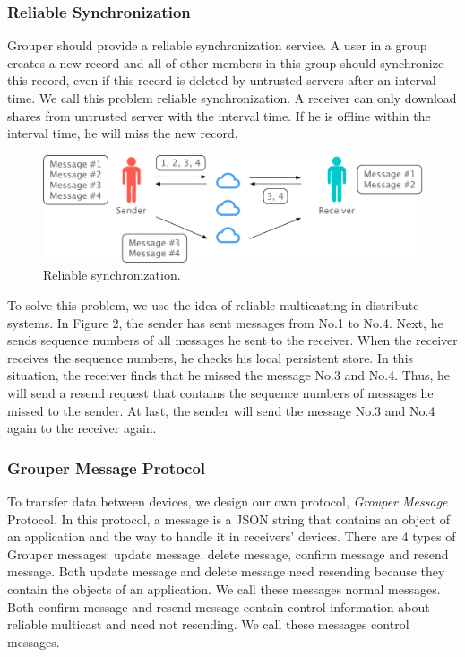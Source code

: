 \documentclass[twocolumn,10pt]{article}
\begin{document}
\subsubsection{Reliable Synchronization}

Grouper should provide a reliable synchronization service. 
A user in a group creates a new record and all of other members in this group should synchronize this record, even if this record is deleted by untrusted servers after an interval time. 
We call this problem reliable synchronization. 
A receiver can only download shares from untrusted server with the interval time. 
If he is offline within the interval time, he will miss the new record.

\begin{figure}[t]
	\centering
	\includegraphics[scale=0.32]{reliable_sync}
	\caption{Reliable synchronization.}
\end{figure}

To solve this problem, we use the idea of reliable multicasting in distribute systems. 
In Figure 2, the sender has sent messages from No.1 to No.4. 
Next, he sends sequence numbers of all messages he sent to the receiver. 
When the receiver receives the sequence numbers, he checks his local persistent store. 
In this situation, the receiver finds that he missed the message No.3 and No.4. 
Thus, he will send a resend request that contains the sequence numbers of messages he missed to the sender. 
At last, the sender will send the message No.3 and No.4 again to the receiver again.

\subsubsection{Grouper Message Protocol}

To transfer data between devices, we design our own protocol, \emph{Grouper Message} Protocol. 
In this protocol, a message is a JSON string that contains an object of an application and the way to handle it in receivers’ devices. 
There are 4 types of Grouper messages: update message, delete message, confirm message and resend message. 
Both update message and delete message need resending because they contain the objects of an application. 
We call these messages normal messages. 
Both confirm message and resend message contain control information about reliable multicast and need not resending. 
We call these messages control messages.
\end{document}
